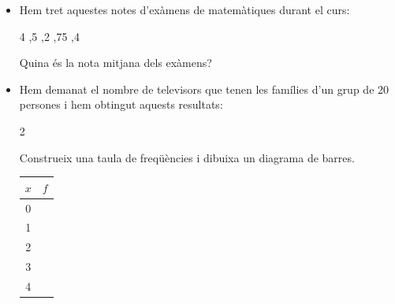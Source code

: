 


 \begin{iniaval}

\begin{itemize}
	\item 
 Hem tret aquestes notes d'exàmens de matemàtiques durant el curs: 
\begin{center}
 4 \quad{},5  \quad{}   \quad{},2   \quad{}   \quad{},75   \quad{},4  
 \end{center}
 Quina és la nota mitjana dels exàmens?
 

\item  Hem demanat el nombre de televisors que tenen les famílies d'un grup de 20 persones i hem obtingut aquests resultats:
\begin{center}
2                         
\end{center}
Construeix una taula de freqüències i dibuixa un diagrama de barres.

\begin{minipage}{0.5\textwidth}
	\begin{center}
	\begin{tabular}{c|c}
		$x$ & $f$	\\  \hline
		0 & 	\\  \hline
		1 & 	\\  \hline
		2 & 	\\  \hline
		3 & 	\\  \hline
		4 &  	
	\end{tabular}
\end{center}	
\end{minipage}
\begin{minipage}{0.5\textwidth}
	\begin{center}
\end{center}
\end{minipage}
\end{itemize}
\end{iniaval}
